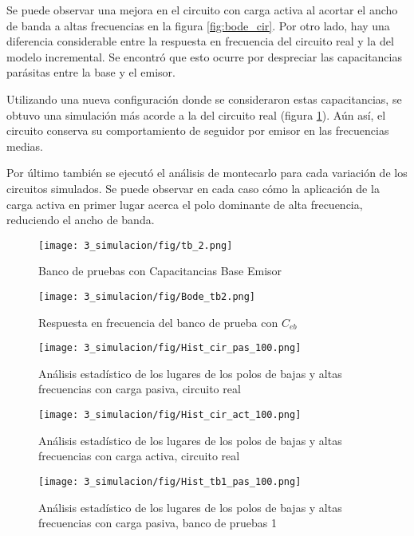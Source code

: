 Se puede observar una mejora en el circuito con carga activa al acortar el ancho de banda a altas frecuencias en la figura \ref{fig:bode_cir}. Por otro lado, hay una diferencia considerable entre la respuesta en frecuencia del circuito real y la del modelo incremental. Se encontró que esto ocurre por despreciar las capacitancias parásitas entre la base y el emisor.

Utilizando una nueva configuración donde se consideraron estas capacitancias, se obtuvo una simulación más acorde a la del circuito real (figura \ref{fig:bode_tb2}). Aún así, el circuito conserva su comportamiento de seguidor por emisor en las frecuencias medias.

Por último también se ejecutó el análisis de montecarlo para cada variación de los circuitos simulados. Se puede observar en cada caso cómo la aplicación de la carga activa en primer lugar acerca el polo dominante de alta frecuencia, reduciendo el ancho de banda.

\begin{figure}
    \centering
    \texttt{[image: 3\_simulacion/fig/tb\_2.png]}
    \caption{Banco de pruebas con Capacitancias Base Emisor}
\end{figure}

\begin{figure}
    \centering
    \texttt{[image: 3\_simulacion/fig/Bode\_tb2.png]}
    \caption{Respuesta en frecuencia del banco de prueba con $C_{eb}$}
    \label{fig:bode_tb2}
\end{figure}

\begin{figure}
    \centering
    \texttt{[image: 3\_simulacion/fig/Hist\_cir\_pas\_100.png]}
    \caption{Análisis estadístico de los lugares de los polos de bajas y altas frecuencias con carga pasiva, circuito real}
\end{figure}

\begin{figure}
    \centering
    \texttt{[image: 3\_simulacion/fig/Hist\_cir\_act\_100.png]}
    \caption{Análisis estadístico de los lugares de los polos de bajas y altas frecuencias con carga activa, circuito real}
\end{figure}

\begin{figure}
    \centering
    \texttt{[image: 3\_simulacion/fig/Hist\_tb1\_pas\_100.png]}
    \caption{Análisis estadístico de los lugares de los polos de bajas y altas frecuencias con carga pasiva, banco de pruebas 1}
\end{figure}

